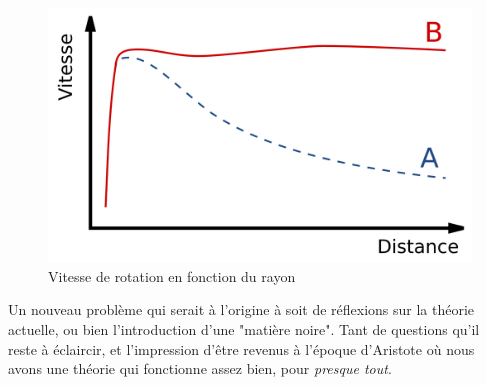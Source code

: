 \documentclass{classe}
\begin{document}
\begin{figure}[H]
\centering
\includegraphics[scale=.16]{MatNoire.png}
\caption{Vitesse de rotation en fonction du rayon}
\end{figure}

Un nouveau problème qui serait à l'origine à soit de réflexions sur la théorie actuelle, ou bien l'introduction d'une "matière noire". Tant de questions qu'il reste à éclaircir, et l'impression d'être revenus à l'époque d'Aristote où nous avons une théorie qui fonctionne assez bien, pour \textit{presque tout}.
\end{document}
